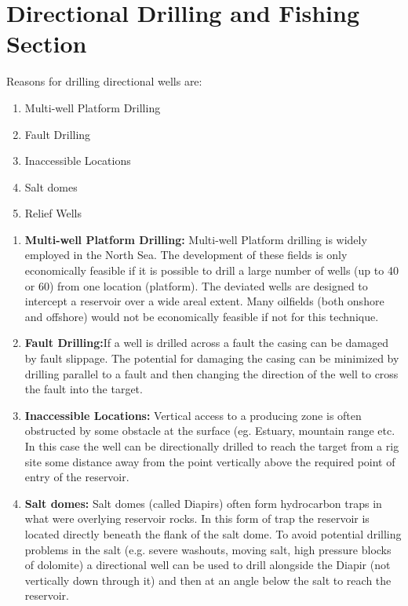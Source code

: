 \chapter{Directional Drilling and Fishing Section}

Reasons for drilling directional wells are:

\begin{enumerate}
\item Multi-well Platform Drilling
\item Fault Drilling
\item Inaccessible Locations
\item Salt domes
\item Relief Wells
\end{enumerate}

\begin{enumerate}

\item \textbf{Multi-well Platform Drilling:} Multi-well Platform drilling is
widely employed in the North Sea. The development of these
fields is only economically feasible if it is possible to drill a
large number of wells (up to 40 or 60) from one location
(platform). The deviated wells are designed to intercept a
reservoir over a wide areal extent. Many oilfields (both onshore
and offshore) would not be economically feasible if not for this
technique.

\item \textbf{Fault Drilling:}If a well is drilled across a fault the casing can
be damaged by fault slippage. The potential for damaging the
casing can be minimized by drilling parallel to a fault and then
changing the direction of the well to cross the fault into the
target.



\item \textbf{Inaccessible Locations:} Vertical access to a producing zone is
often obstructed by some obstacle at the surface (eg. Estuary,
mountain range etc. In this case the well can be directionally
drilled to reach the target from a rig site some distance away
from the point vertically above the required point of entry of the
reservoir.



\item \textbf{Salt domes:} Salt domes (called Diapirs) often
form hydrocarbon traps in what were overlying
reservoir rocks. In this form of trap the reservoir
is located directly beneath the flank of the salt
dome. To avoid potential drilling problems in
the salt (e.g. severe washouts, moving salt, high
pressure blocks of dolomite) a directional well
can be used to drill alongside the Diapir (not
vertically down through it) and then at an angle
below the salt to reach the reservoir.





\end{enumerate}
